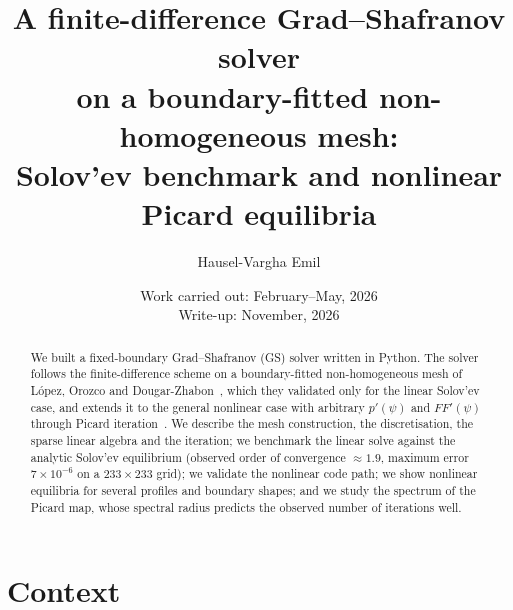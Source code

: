 \documentclass[11pt,a4paper]{article}
\title{\textbf{A finite-difference Grad--Shafranov solver\\ on a boundary-fitted non-homogeneous mesh:\\ Solov'ev benchmark and nonlinear Picard equilibria}}
\author{Hausel-Vargha Emil}
\date{Work carried out: February--May, 2026\\ Write-up: November, 2026}
\begin{document}
\maketitle

\begin{abstract}
We built a fixed-boundary Grad--Shafranov (GS) solver written in Python. The solver follows the finite-difference scheme on a boundary-fitted non-homogeneous mesh of L\'opez, Orozco and Dougar-Zhabon~\cite{lopez2019}, which they validated only for the linear Solov'ev case, and extends it to the general nonlinear case with arbitrary $p'(\psi)$ and $FF'(\psi)$ through Picard iteration~\cite{jardin2010}. We describe the mesh construction, the discretisation, the sparse linear algebra and the iteration; we benchmark the linear solve against the analytic Solov'ev equilibrium (observed order of convergence $\approx 1.9$, maximum error $7\times10^{-6}$ on a $233\times233$ grid); we validate the nonlinear code path; we show nonlinear equilibria for several profiles and boundary shapes; and we study the spectrum of the Picard map, whose spectral radius predicts the observed number of iterations well.
\end{abstract}
\clearpage

\tableofcontents

\clearpage
\section{Context}\label{sec:context}
\end{document}
